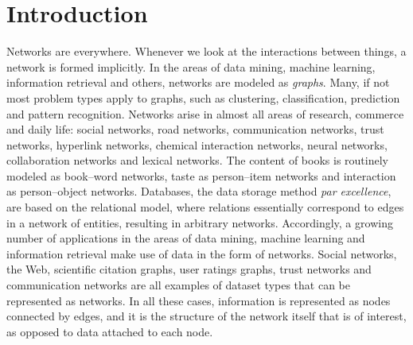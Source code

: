 \documentclass[11pt,a4paper]{book}
\begin{document}
\cleardoublepage
\tableofcontents

\let\OOOchapter\chapter
\renewcommand{\chapter}[1]{\OOOchapter{\texorpdfstring{#1}{\thechapter~#1}}}
\let\OOOsection\section
\renewcommand{\section}[1]{\OOOsection{\texorpdfstring{#1}{\thesection~#1}}}
\newcommand{\sectionX}[2]{\OOOsection[\texorpdfstring{#1}{\thesection~#1}]{#2}}

\clearpage
{}
\chapter{Introduction}
Networks are everywhere.  Whenever we look at the interactions between
things, a network is formed implicitly.  In the areas of data mining,
machine learning, information retrieval and others, networks are modeled
as \emph{graphs}.  Many, if not most problem types apply to
graphs, such as clustering, classification, prediction and pattern
recognition.  Networks arise in almost all areas of research, commerce
and 
daily life: social networks, road networks, communication networks,
trust networks, hyperlink networks, chemical interaction networks,
neural networks, collaboration networks and lexical networks.  The
content of books is routinely modeled as book--word networks, taste as
person--item networks and interaction as person--object networks.
Databases, the data storage method \emph{par excellence}, are based on
the relational model, where relations essentially correspond to edges in
a network of entities, resulting in arbitrary networks. 
Accordingly, a growing number of applications in the areas of data mining,
machine learning and information retrieval make use of data in the form
of networks.  
Social networks, the Web, scientific citation graphs, user ratings graphs,
trust networks and 
communication networks are all examples of dataset types that can be
represented as networks.  In all these cases, information is represented
as nodes connected by edges, and it is the structure of the network
itself that is of interest, as opposed to data attached to each node.
\end{document}
